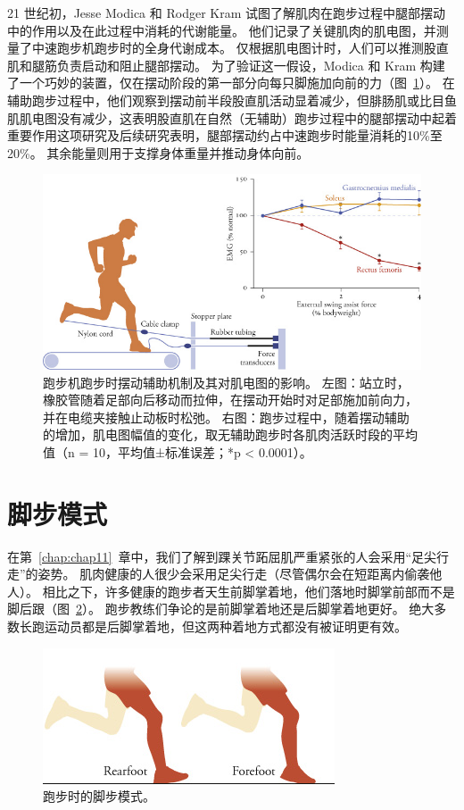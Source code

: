 21 世纪初，Jesse Modica 和 Rodger Kram 试图了解肌肉在跑步过程中腿部摆动中的作用以及在此过程中消耗的代谢能量。
他们记录了关键肌肉的肌电图，并测量了中速跑步机跑步时的全身代谢成本。
仅根据肌电图计时，人们可以推测股直肌和腿筋负责启动和阻止腿部摆动。
为了验证这一假设，Modica 和 Kram 构建了一个巧妙的装置，仅在摆动阶段的第一部分向每只脚施加向前的力（图~\ref{fig:12_8}）。
在辅助跑步过程中，他们观察到摆动前半段股直肌活动显着减少，但腓肠肌或比目鱼肌肌电图没有减少，这表明股直肌在自然（无辅助）跑步过程中的腿部摆动中起着重要作用这项研究及后续研究表明，腿部摆动约占中速跑步时能量消耗的10\%至20\%。
其余能量则用于支撑身体重量并推动身体向前。

\begin{figure}[!htb]
	\centering
	\includegraphics[width=1.0\linewidth]{chap12/12_8}
	\caption{跑步机跑步时摆动辅助机制及其对肌电图的影响。
		左图：站立时，橡胶管随着足部向后移动而拉伸，在摆动开始时对足部施加前向力，并在电缆夹接触止动板时松弛。
		右图：跑步过程中，随着摆动辅助的增加，肌电图幅值的变化，取无辅助跑步时各肌肉活跃时段的平均值（n = 10，平均值±标准误差；*p < 0.0001）\cite{modica2005metabolic}。 \label{fig:12_8}}
\end{figure}



\section{脚步模式}

在第~\ref{chap:chap11}~章中，我们了解到踝关节跖屈肌严重紧张的人会采用“足尖行走”的姿势。
肌肉健康的人很少会采用足尖行走（尽管偶尔会在短距离内偷袭他人）。
相比之下，许多健康的跑步者天生前脚掌着地，他们落地时脚掌前部而不是脚后跟（图~\ref{fig:12_9}）。
跑步教练们争论的是前脚掌着地还是后脚掌着地更好。
绝大多数长跑运动员都是后脚掌着地，但这两种着地方式都没有被证明更有效。


\begin{figure}[!htb]
	\centering
	\includegraphics[width=0.5\linewidth]{chap12/12_9}
	\caption{跑步时的脚步模式。 \label{fig:12_9}}
\end{figure}


